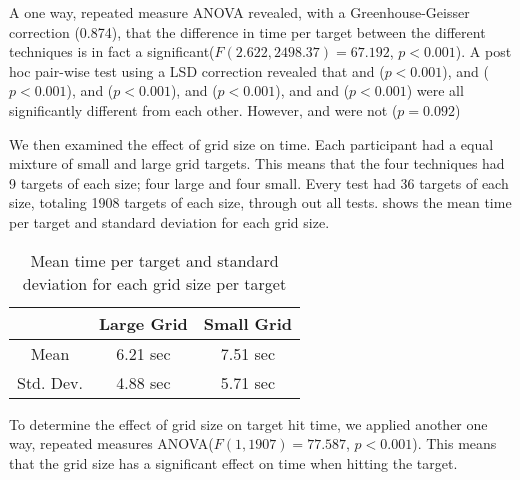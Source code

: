 
A one way, repeated measure ANOVA revealed, with a Greenhouse-Geisser correction (0.874), that the difference in time per target between the different techniques is in fact a significant($F(2.622, 2498.37)=67.192$, $p<0.001$). A post hoc pair-wise test using a LSD correction revealed that \pinch and \swipe($p<0.001$), \pinch and \tilt ($p<0.001$), \pinch and \throw ($p<0.001$), \swipe and \throw ($p<0.001$), and \throw and \tilt ($p<0.001$) were all significantly different from each other. However, \swipe and \tilt were not ($p=0.092$)

We then examined the effect of grid size on time. Each participant had a equal mixture of small and large grid targets. This means that the four techniques had 9 targets of each size; four large and four small. Every test had 36 targets of each size, totaling 1908 targets of each size, through out all tests.  shows the mean time per target and standard deviation for each grid size. 

\begin{table}[H]
	\centering
	\begin{tabular}{|c|c|c|}
		\hline
		\rowcolor[HTML]{9B9B9B} 
		 & \textbf{Large Grid} & \textbf{Small Grid} \\ \hline
		Mean & 6.21 sec & 7.51 sec \\ \hline
		Std. Dev. & 4.88 sec & 5.71 sec \\ \hline
	\end{tabular}
	\caption{Mean time per target and standard deviation for each grid size per target}
	\label{tab:meanTimesSize}
\end{table}

To determine the effect of grid size on target hit time, we applied another one way, repeated measures ANOVA($F(1,1907) = 77.587$, $p<0.001$). This means that the grid size has a significant effect on time when hitting the target. 

